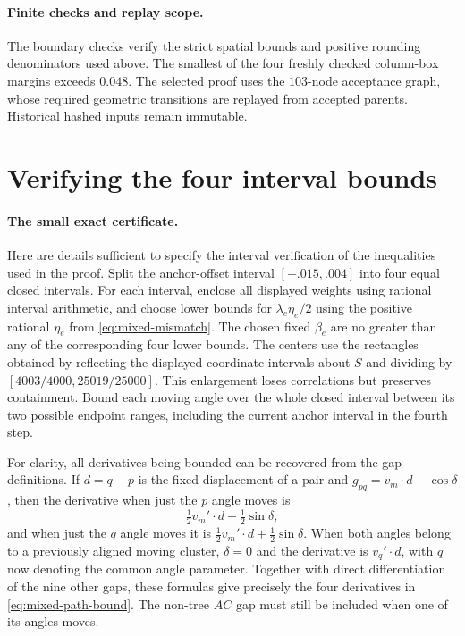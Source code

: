 \documentclass[11pt]{article}
\begin{document}
\paragraph{Finite checks and replay scope.}
The boundary checks verify the strict spatial bounds and positive rounding
denominators used above. The smallest of the four freshly checked
column-box margins exceeds $0.048$. The selected proof uses the
$103$-node acceptance graph, whose required geometric transitions are
replayed from accepted parents. Historical hashed inputs remain immutable.


\section{Verifying the four interval bounds}\label{app:mixed-intervals}
\paragraph{The small exact certificate.}
Here are details sufficient to specify the interval verification of the
inequalities used in the proof. Split the anchor-offset interval
$[-.015,.004]$ into four equal closed intervals. For each interval, enclose
all displayed weights using rational interval arithmetic, and choose
lower bounds for $\lambda_e\eta_e/2$ using the positive
rational $\eta_e$ from \eqref{eq:mixed-mismatch}.
The chosen fixed $\beta_e$ are no greater than any of the corresponding
four lower bounds. The centers use the rectangles obtained by
reflecting the displayed coordinate intervals about $S$ and dividing by
$[4003/4000,25019/25000]$. This enlargement loses correlations but preserves
containment. Bound each moving angle over the whole closed interval
between its two possible endpoint ranges, including the current anchor
interval in the fourth step.

For clarity, all derivatives being bounded can be recovered from the
gap definitions. If $d=q-p$ is the fixed displacement of a pair and
$g_{pq}=v_m\cdot d-\cos\delta$, then the derivative when just the
$p$ angle moves is
\[
 \tfrac12v_m'\cdot d-\tfrac12\sin\delta,
\]
and when just the $q$ angle moves it is
$\tfrac12v_m'\cdot d+\tfrac12\sin\delta$.
When both angles belong to a previously aligned moving cluster,
$\delta=0$ and the derivative is $v_q'\cdot d$, with $q$ now denoting
the common angle parameter. Together with direct differentiation of the
nine other gaps, these formulas give precisely the four derivatives
in \eqref{eq:mixed-path-bound}. The non-tree $AC$ gap must still be
included when one of its angles moves.
\end{document}
